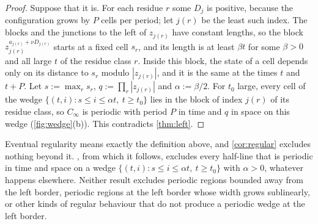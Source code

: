 \begin{proof}
Suppose that it is. For each residue $r$ some $D_j$ is positive, because the
configuration grows by $P$ cells per period; let $j(r)$ be the least such
index. The blocks and the junctions to the left of $z_{j(r)}$ have constant
lengths, so the block $z_{j(r)}^{a_{j(r)}+\nu D_{j(r)}}$ starts at a fixed cell
$s_r$, and its length is at least $\beta t$ for some $\beta>0$ and all large
$t$ of the residue class $r$. Inside this block, the state of a cell depends
only on its distance to $s_r$ modulo $|z_{j(r)}|$, and it is the same at the
times $t$ and $t+P$. Let $s:=\max_r s_r$, $q:=\prod_r|z_{j(r)}|$ and
$\alpha:=\beta/2$. For $t_0$ large, every cell of the wedge $\{(t,i):s\le
i\le\alpha t,\ t\ge t_0\}$ lies in the block of index $j(r)$ of its residue
class, so $C_\infty$ is periodic with period $P$ in time and $q$ in space on
this wedge (\cref{fig:wedge}(b)). This contradicts \cref{thm:left}.
\end{proof}

Eventual regularity means exactly the definition above, and \cref{cor:regular}
excludes nothing beyond it. , from which it follows, excludes
every half-line that is periodic in time and space on a wedge
$\{(t,i):s\le i\le\alpha t,\ t\ge t_0\}$ with $\alpha>0$, whatever happens
elsewhere. Neither result excludes periodic regions bounded away from the left
border, periodic regions at the left border whose width grows sublinearly, or
other kinds of regular behaviour that do not produce a periodic wedge at the
left border.
